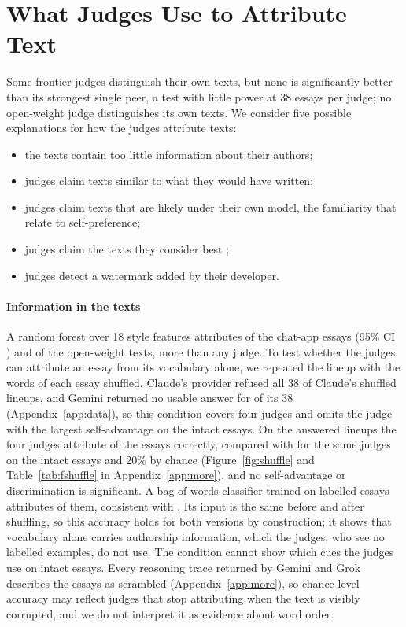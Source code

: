 \section{What Judges Use to Attribute Text}
\label{sec:mechanism}
\label{sec:watermark}

Some frontier judges distinguish their own texts, but none is significantly
better than its strongest single peer, a test with little power at 38 essays
per judge; no open-weight judge distinguishes its own texts.
We consider five possible explanations for how the judges attribute texts:
\begin{itemize}
\item the texts contain too little information about their authors;
\item judges claim texts similar to what they would have written;
\item judges claim texts that are likely under their own model, the familiarity
that \citet{wataoka2024perplexity} relate to self-preference;
\item judges claim the texts they consider best
\citep{davidson2024anonymized, stamand2026sgtr};
\item judges detect a watermark added by their developer.
\end{itemize}

\paragraph{Information in the texts}
A random forest over 18 style features attributes \EngineAAcc{} of the chat-app
essays (95\% CI \EngineACI{}) and \OWClfPooled{} of the open-weight texts, more
than any judge. To test whether the judges can attribute an essay from its
vocabulary alone, we repeated the lineup with the words of each essay
shuffled. Claude's provider refused all 38 of Claude's shuffled lineups, and
Gemini returned no usable answer for \FSGeminiMissing{} of its 38
(Appendix~\ref{app:data}), so this condition covers four judges and omits the
judge with the largest self-advantage on the intact essays. On the \FSNLineups{} answered
lineups the four judges attribute \FSAcc{} of the essays correctly, compared
with \CXIntactAccFour{} for the same judges on the intact essays and 20\% by
chance (Figure~\ref{fig:shuffle} and Table~\ref{tab:fshuffle} in
Appendix~\ref{app:more}), and no self-advantage or discrimination is
significant. A bag-of-words classifier trained on labelled essays attributes
\BowShufAcc{} of them, consistent with \citet{sun2025stylometric}. Its input is
the same before and after shuffling, so this accuracy holds for both versions
by construction; it shows that vocabulary alone carries authorship information,
which the judges, who see no labelled examples, do not use. The condition
cannot show which cues the judges use on intact essays. Every reasoning trace
returned by Gemini and Grok describes the essays as scrambled
(Appendix~\ref{app:more}), so chance-level accuracy may reflect judges that
stop attributing when the text is visibly corrupted, and we do not interpret
it as evidence about word order.

